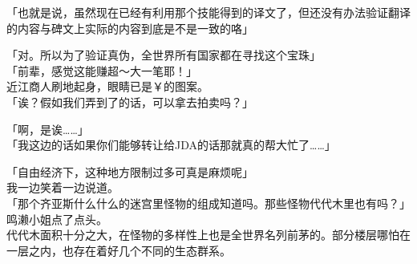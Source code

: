 「也就是说，虽然现在已经有利用那个技能得到的译文了，但还没有办法验证翻译的内容与碑文上实际的内容到底是不是一致的咯」

「对。所以为了验证真伪，全世界所有国家都在寻找这个宝珠」\\

「前辈，感觉这能赚超～大一笔耶！」\\

近江商人刷地起身，眼睛已是￥的图案。\\

「诶？假如我们弄到了的话，可以拿去拍卖吗？」

「啊，是诶……」\\

「我这边的话如果你们能够转让给JDA的话那就真的帮大忙了……」

「自由经济下，这种地方限制过多可真是麻烦呢」\\

我一边笑着一边说道。\\

「那个齐亚斯什么什么的迷宫里怪物的组成知道吗。那些怪物代代木里也有吗？」\\

鸣濑小姐点了点头。\\

代代木面积十分之大，在怪物的多样性上也是全世界名列前茅的。部分楼层哪怕在一层之内，也存在着好几个不同的生态群系。

